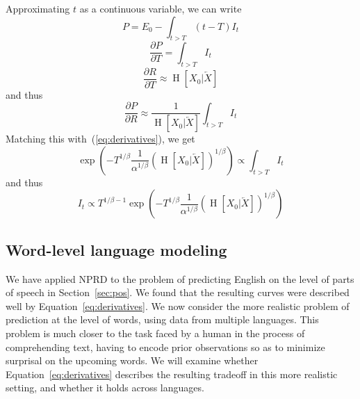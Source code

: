 \documentclass[11pt,letterpaper]{article}
\begin{document}
Approximating $t$ as a continuous variable, we can write
\begin{equation}
	P =	E_0 - \int_{t > T} (t-T) I_t
\end{equation}
\begin{equation}
	\frac{\partial P}{\partial T} =	\int_{t > T} I_t
\end{equation}
\begin{equation}
	\frac{\partial R}{\partial T} \approx \operatorname{H}[X_0|\overleftarrow{X}]
\end{equation}
and thus
\begin{equation}
	\frac{\partial P}{\partial R} \approx	\frac{1}{\operatorname{H}[X_0|\overleftarrow{X}]} \int_{t > T} I_t
\end{equation}
Matching this with~(\ref{eq:derivatives}), we get
\begin{equation}
	\exp\left(-T^{1/\beta} \frac{1}{\alpha^{1/\beta}} (\operatorname{H}[X_0|\overleftarrow{X}])^{1/\beta}\right) \propto \int_{t > T} I_t
\end{equation}
and thus
\begin{equation}
I_t \propto T^{1/\beta-1}	\exp\left(-T^{1/\beta} \frac{1}{\alpha^{1/\beta}} (\operatorname{H}[X_0|\overleftarrow{X}])^{1/\beta}\right)
\end{equation}


\subsection{Word-level language modeling}


We have applied NPRD to the problem of predicting English on the level of parts of speech in Section~\ref{sec:pos}.
We found that the resulting curves were described well by Equation~\ref{eq:derivatives}.
We now consider the more realistic problem of prediction at the level of words, using data from multiple languages.
This problem is much closer to the task faced by a human in the process of comprehending text, having to encode prior observations so as to minimize surprisal on the upcoming words.
We will examine whether Equation~\ref{eq:derivatives} describes the resulting tradeoff in this more realistic setting, and whether it holds across languages.
\end{document}
